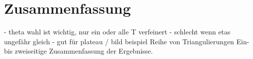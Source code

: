 \chapter*{Zusammenfassung}

- theta wahl ist wichtig, nur ein oder alle T verfeinert
- schlecht wenn etas ungefähr gleich
- gut für plateau / bild beispiel
Reihe von Triangulierungen 
Ein- bis zweiseitige Zusammenfassung der Ergebnisse.